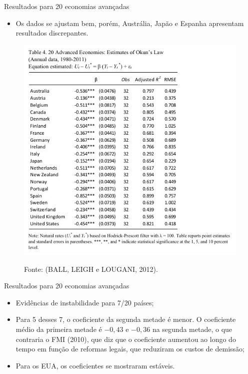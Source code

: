 \documentclass[11pt]{beamer}
\begin{document}
\begin{frame}{Resultados para 20 economias avançadas}

\begin{itemize}
    \item Os dados se ajustam bem, porém, Austrália, Japão e Espanha apresentam resultados discrepantes.
\end{itemize}

\begin{figure}[H]
	\centering
	\label{fig:tabela_4}
	\includegraphics[height = 0.65\textheight, width=0.65\linewidth]{"Figuras/tabela_4.jpeg"} \\
\caption*{\small Fonte: (BALL, LEIGH e LOUGANI, 2012).}
\end{figure}

\end{frame}

\begin{frame}{Resultados para 20 economias avançadas}

\begin{itemize}
    \item Evidências de instabilidade para 7/20 países;
 
    \item Para 5 desses 7, o coeficiente da segunda metade é menor. O coeficiente médio da primeira metade é $-0,43$ e $-0,36$ na segunda metade, o que contraria o FMI (2010), que diz que o coeficiente aumentou ao longo do tempo em função de reformas legais, que reduziram os custos de demissão;
 \item Para os EUA, os coeficientes se mostraram estáveis. 
\end{itemize}  
 
\end{frame}
\end{document}

